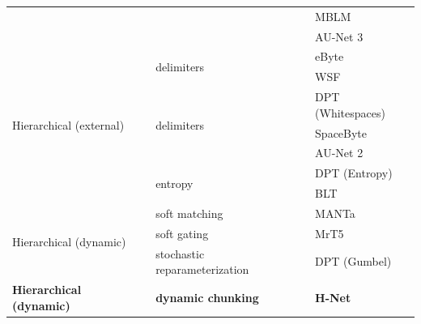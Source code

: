 \documentclass{article}
\newcommand{\cmark}{\ding{51}}
\newcommand{\xmark}{\ding{55}}
\theoremstyle{plain}
\theoremstyle{remark}
\begin{document}
\begin{table}[t!]
{\begin{tabular}{@{}lllll@{}}
                                &                          &                                           &                 & MBLM \\
                                &                          &                                           &                 & AU-Net 3 \\
\midrule
\multirow{7}{*}{\vspace{-3mm}Hierarchical (external)}         & \multirow{2}{*}{\xmark}                   & \multirow{2}{*}{delimiters}                                & \multirow{2}{*}{\xmark}          & eByte \\
                                &                          &                                           &                 & WSF \\
\cmidrule[0.05pt]{2-5}                         
                                & \multirow{5}{*}{\cmark}                   & \multirow{3}{*}{delimiters}                                & \multirow{3}{*}{\xmark}          & DPT (Whitespaces) \\
                                &                          &                                           &                 & SpaceByte \\
                                &                          &                                           &                 & AU-Net 2 \\
\cmidrule[0.05pt]{3-5}    
                                &                          & \multirow{2}{*}{entropy}                                   & \multirow{2}{*}{\xmark}          & DPT (Entropy) \\
                                &                          &                                           &                 & BLT \\
\midrule
\multirow{3}{*}{\vspace{-2mm}Hierarchical (dynamic)}          & \multirow{3}{*}{\vspace{-2mm}\cmark}                   & soft matching                             & \xmark          & MANTa \\
\cmidrule[0.05pt]{3-5}   
                                &                          & soft gating                               & \xmark          & MrT5 \\
\cmidrule[0.05pt]{3-5}  
                                &                          & stochastic reparameterization             & \xmark          & DPT (Gumbel) \\
\midrule
\textbf{Hierarchical (dynamic)} & \cmark                   & \textbf{dynamic chunking}                 & \cmark          & \textbf{H-Net} \\
\bottomrule
\end{tabular}
} 
\label{tab: related}
\end{table}
\end{document}
